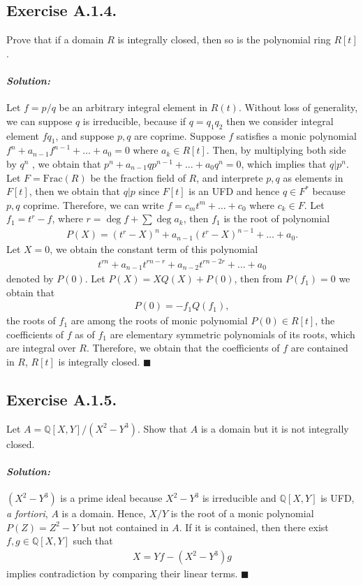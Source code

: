 \documentclass[12pt, a4paper]{article}
\newenvironment{solution}
  {\paragraph{\textit{Solution:}}\par\medskip}
  {\hfill$\blacksquare$\vspace{0.1cm}}
\begin{document}
\subsection*{Exercise A.1.4.} 
Prove that if a domain $R$ is integrally closed, then so is the polynomial ring $R[t]$.
\begin{solution}
Let $f=p/q$ be an arbitrary integral element in $R(t)$. Without loss of generality, we can suppose $q$ is irreducible, because if $q=q_1q_2$ then we consider
integral element $fq_1$, and suppose $p,q$ are coprime. Suppose $f$ satisfies a monic polynomial $f^n+a_{n-1}f^{n-1}+\dots+a_0=0$ where $a_k\in R[t]$. Then, by multiplying both side by $q^n$ 
, we obtain that $p^n+a_{n-1}qp^{n-1}+\dots+a_0q^n=0$, which implies that $q|p^n$. Let $F=\text{Frac}(R)$ be the fraction field of $R$, and 
interprete $p,q$ as elements in $F[t]$, then we obtain that $q|p$ since $F[t]$ is an UFD and hence $q\in F^*$ because $p,q$ coprime.
Therefore, we can write $f=c_mt^m+\dots+c_0$ where $c_k\in F$.  Let $f_1 = t^r - f$, where $r=\deg f+\sum \deg a_k$, then $f_1$ is the root of polynomial
\begin{align*}
    P(X)=(t^r-X)^{n}+a_{n-1}(t^r-X)^{n-1}+\dots + a_0.
\end{align*}
Let $X=0$, we obtain the constant term of this polynomial
\begin{align*}
    t^{rn}+a_{n-1}t^{rn-r}+a_{n-2}t^{rn-2r}+\dots+a_0
\end{align*}
denoted by $P(0)$. Let $P(X)=XQ(X)+P(0)$, then from $P(f_1)=0$ we obtain that 
\begin{align*}
    P(0) = -f_1Q(f_1),
\end{align*} 
the roots of $f_1$ are among the roots of monic polynomial $P(0)\in R[t]$, the coefficients of $f$ as of $f_1$ are elementary symmetric polynomials of its roots, which are integral over $R$. Therefore, we obtain that the coefficients of 
$f$ are contained in $R$, $R[t]$ is integrally closed.  
\end{solution}



\subsection*{Exercise A.1.5.} 
Let $A = \mathbb{Q}[X, Y]/(X^2 - Y^3)$. Show that $A$ is a domain but it is not integrally closed.
\begin{solution}
    $(X^2-Y^3)$ is a prime ideal because $X^2-Y^3$ is irreducible and $\mathbb{Q}[X,Y]$ is UFD, \textit{a fortiori}, $A$ is a domain.
    Hence, $X/Y$ is the root of a monic polynomial $P(Z) = Z^2-Y$ but not contained in $A$. If it is contained, then there exist $f,g\in\mathbb{Q}[X,Y]$ such that 
    \begin{align*}
        X = Yf-(X^2-Y^3)g
    \end{align*}
    implies contradiction by comparing their linear terms.
\end{solution}
\end{document}
